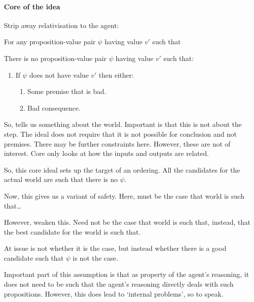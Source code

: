 \paragraph{Core of the idea}

\begin{note}
  Strip away relativisation to the agent:
  \begin{ideal}
    For any proposition-value pair \(\psi\) having value \(v'\) such that

    There is no proposition-value pair \(\psi\) having value \(v'\) such that:
    \begin{enumerate}
    \item If \(\psi\) does not have value \(v'\) then either:
      \begin{enumerate}
      \item Some premise that is bad.
      \item Bad consequence.
      \end{enumerate}
    \end{enumerate}
  \end{ideal}
  So, tells us something about the world.
  Important is that this is not about the step.
  The ideal does not require that it is not possible for conclusion and not premises.
  There may be further constraints here.
  However, these are not of interest.
  Core only looks at how the inputs and outputs are related.
\end{note}

\begin{note}
  So, this core ideal sets up the target of an ordering.
  All the candidates for the actual world are such that there is no \(\psi\).

  Now, this gives us a variant of safety.
  Here, must be the case that world is such that\dots

  However, weaken this.
  Need not be the case that world is such that, instead, that the best candidate for the world is such that.

  At issue is not whether it is the case, but instead whether there is a good candidate such that \(\psi\) is not the case.
\end{note}

\begin{note}
  Important part of this assumption is that as property of the agent's reasoning, it does not need to be such that the agent's reasoning directly deals with such propositions.
  However, this does lead to `internal problems', so to speak.
\end{note}


